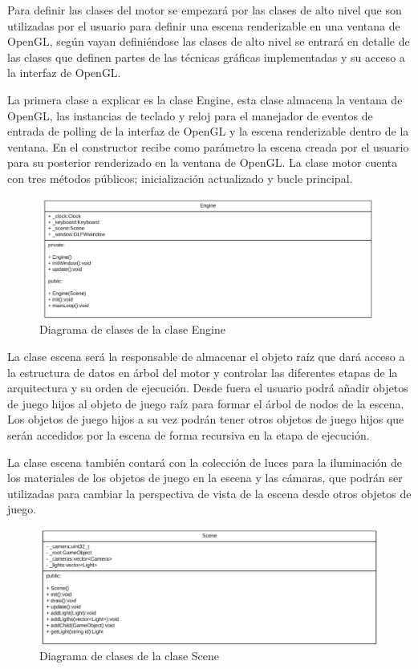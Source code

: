 \documentclass[a4paper, 17pt]{book}
\begin{document}
Para definir las clases del motor se empezará por las clases de alto nivel que son utilizadas por el usuario para definir una
escena renderizable en una ventana de OpenGL, según vayan definiéndose las clases de alto nivel se entrará en detalle de las
clases que definen partes de las técnicas gráficas implementadas y su acceso a la interfaz de OpenGL.

La primera clase a explicar es la clase Engine, esta clase almacena la ventana de OpenGL, las instancias de teclado y reloj
para el manejador de eventos de entrada de polling de la interfaz de OpenGL y la escena renderizable dentro de la ventana.
En el constructor recibe como parámetro la escena creada por el usuario para su posterior renderizado en la ventana de OpenGL.
La clase motor cuenta con tres métodos públicos; inicialización actualizado y bucle principal.

\begin{figure}[hbt!]
    \centering
    \includegraphics[scale=0.30, keepaspectratio]{img/Engine.png}
    \caption{Diagrama de clases de la clase Engine}
    \label{figura:Blender}
\end{figure}

La clase escena será la responsable de almacenar el objeto raíz que dará acceso a la estructura de datos en árbol del motor y
controlar las diferentes etapas de la arquitectura y su orden de ejecución. Desde fuera el usuario podrá añadir objetos de
juego hijos al objeto de juego raíz para formar el árbol de nodos de la escena. Los objetos de juego hijos a su vez podrán
tener otros objetos de juego hijos que serán accedidos por la escena de forma recursiva en la etapa de ejecución.

La clase escena también contará con la colección de luces para la iluminación de los materiales de los objetos de juego en
la escena y las cámaras, que podrán ser utilizadas para cambiar la perspectiva de vista de la escena desde otros objetos de juego.

\begin{figure}[hbt!]
    \centering
    \includegraphics[scale=0.30, keepaspectratio]{img/Scene.png}
    \caption{Diagrama de clases de la clase Scene}
    \label{figura:Blender}
\end{figure}
\end{document}
